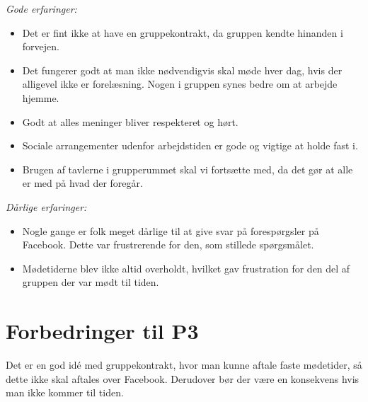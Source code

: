 \emph{Gode erfaringer:}
\begin{itemize}

\item	Det er fint ikke at have en gruppekontrakt, da gruppen kendte hinanden i forvejen.

\item	Det fungerer godt at man ikke nødvendigvis skal møde hver dag, hvis der alligevel ikke er forelæsning. Nogen i gruppen synes bedre om at arbejde hjemme.  

\item	Godt at alles meninger bliver respekteret og hørt.

\item	Sociale arrangementer udenfor arbejdstiden er gode og vigtige at holde fast i.

\item	 Brugen af tavlerne i grupperummet skal vi fortsætte med, da det gør at alle er med på hvad der foregår. 
\end{itemize}\emph{Dårlige erfaringer:}
\begin{itemize}

\item	 Nogle gange er folk meget dårlige til at give svar på forespørgsler på Facebook. Dette var frustrerende for den, som stillede spørgsmålet.

\item	Mødetiderne blev ikke altid overholdt, hvilket gav frustration for den del af gruppen der var mødt til tiden.
\end{itemize}

\section{Forbedringer til P3}
Det er en god idé med gruppekontrakt, hvor man kunne aftale faste mødetider, så dette ikke skal aftales over Facebook. Derudover bør der være en konsekvens hvis man ikke kommer til tiden.
